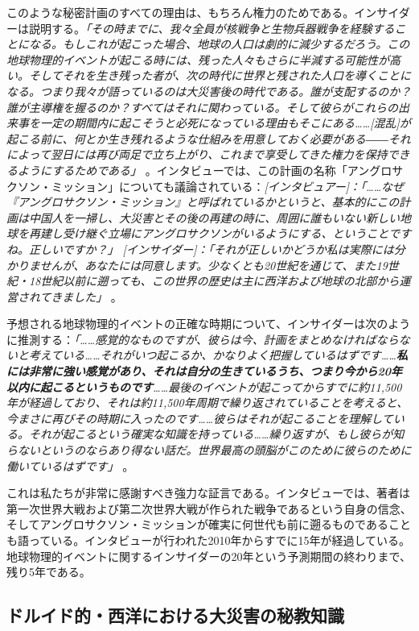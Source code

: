 \documentclass[10pt,twocolumn,letterpaper]{article}
\begin{document}
このような秘密計画のすべての理由は、もちろん権力のためである。インサイダーは説明する。\textit{「その時までに、我々全員が核戦争と生物兵器戦争を経験することになる。もしこれが起こった場合、地球の人口は劇的に減少するだろう。この地球物理的イベントが起こる時には、残った人々もさらに半減する可能性が高い。そしてそれを生き残った者が、次の時代に世界と残された人口を導くことになる。つまり我々が語っているのは大災害後の時代である。誰が支配するのか？誰が主導権を握るのか？すべてはそれに関わっている。そして彼らがこれらの出来事を一定の期間内に起こそうと必死になっている理由もそこにある……[混乱]が起こる前に、何とか生き残れるような仕組みを用意しておく必要がある――それによって翌日には再び両足で立ち上がり、これまで享受してきた権力を保持できるようにするためである」} \cite{4}。インタビューでは、この計画の名称「アングロサクソン・ミッション」についても議論されている：\textit{[インタビュアー]：「……なぜ『アングロサクソン・ミッション』と呼ばれているかというと、基本的にこの計画は中国人を一掃し、大災害とその後の再建の時に、周囲に誰もいない新しい地球を再建し受け継ぐ立場にアングロサクソンがいるようにする、ということですね。正しいですか？」 [インサイダー]：「それが正しいかどうか私は実際には分かりませんが、あなたには同意します。少なくとも20世紀を通じて、また19世紀・18世紀以前に遡っても、この世界の歴史は主に西洋および地球の北部から運営されてきました」} \cite{4}。

予想される地球物理的イベントの正確な時期について、インサイダーは次のように推測する：\textit{「……感覚的なものですが、彼らは今、計画をまとめなければならないと考えている……それがいつ起こるか、かなりよく把握しているはずです……\textbf{私には非常に強い感覚があり、それは自分の生きているうち、つまり今から20年以内に起こるというものです}……最後のイベントが起こってからすでに約11,500年が経過しており、それは約11,500年周期で繰り返されていることを考えると、今まさに再びその時期に入ったのです……彼らはそれが起こることを理解している。それが起こるという確実な知識を持っている……繰り返すが、もし彼らが知らないというのならあり得ない話だ。世界最高の頭脳がこのために彼らのために働いているはずです」} \cite{4}。

これは私たちが非常に感謝すべき強力な証言である。インタビューでは、著者は第一次世界大戦および第二次世界大戦が作られた戦争であるという自身の信念、そしてアングロサクソン・ミッションが確実に何世代も前に遡るものであることも語っている。インタビューが行われた2010年からすでに15年が経過している。地球物理的イベントに関するインサイダーの20年という予測期間の終わりまで、残り5年である。

\subsection{ドルイド的・西洋における大災害の秘教知識}
\end{document}
